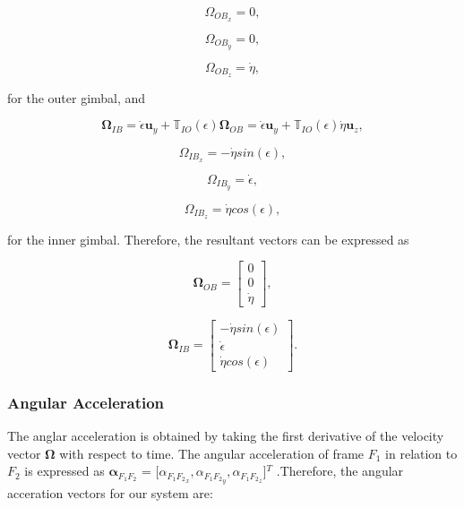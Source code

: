\begin{equation}
   \label{equacaoOB}
   \Omega_{OB_x} = 0,
\end{equation}

\begin{equation}
   \Omega_{OB_y} = 0,
\end{equation}

\begin{equation}
   \Omega_{OB_z} = \dot \eta,
\end{equation}

for the outer gimbal, and

\begin{equation}
   \mathbf{\Omega}_{IB} = \dot \epsilon \bm{u}_y + \mathbb{T}_{IO}(\epsilon)  \mathbf{\Omega}_{OB} = \dot \epsilon \bm{u}_y + \mathbb{T}_{IO}(\epsilon)  \dot \eta \bm{u}_z,
\end{equation}

\begin{equation}
   \Omega_{IB_x} = -\dot \eta sin(\epsilon),
\end{equation}

\begin{equation}
   \Omega_{IB_y} = \dot \epsilon,
\end{equation}

\begin{equation}
   \label{equacaoIB}
   \Omega_{IB_z} = \dot \eta cos(\epsilon),
\end{equation}

for the inner gimbal. Therefore, the resultant vectors can be expressed as

 \begin{equation}
    \mathbf{\Omega}_{OB} = \left[\begin{matrix} 0 \\ 0 \\ \dot \eta \end{matrix}\right],
 \end{equation}

 \begin{equation}
    \mathbf{\Omega}_{IB} = \left[\begin{matrix} -\dot \eta sin(\epsilon) \\ \dot \epsilon \\ \dot \eta cos(\epsilon) \end{matrix}\right].
 \end{equation}

 \subsubsection{Angular Acceleration}
The anglar acceleration is obtained by taking the first derivative of the velocity vector $\mathbf{\Omega}$ with respect to time. The angular acceleration of frame $F_1$ in relation to $F_2$ is expressed as $\bm{\alpha}_{F_1 F_2}$ = $[\alpha_{{F_1 F_2}_x}, \alpha_{{F_1 F_2}_y}, \alpha_{{F_1 F_2}_z}$]$^T$ .Therefore, the angular acceration vectors for our system are:

